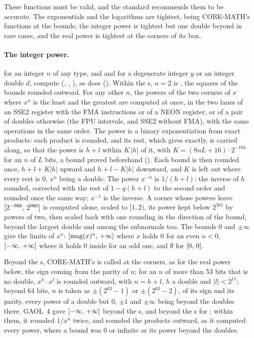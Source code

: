 These functions must be valid, and the standard recommends them to be
accurate. The exponentials and the logarithms are tightest, being
CORE-MATH's functions at the bounds; the integer power is tightest but one
double beyond in rare cases, and the real power is tightest at the corners
of its box.

\paragraph{The integer power.}%
 for an integer $n$ of any type, and  and
 for a degenerate integer $y$ or an integer double $d$,
compute  (, ,
), as does 
(). Within the s, $n=2$ is , the
squares of the bounds rounded outward.\newinvfive{} For any other $n$, the
powers of the two corners of $x$ where $x^n$ is the least and the greatest
are computed at once, in the two lanes of an SSE2 register with the FMA
instructions or of a NEON register, or of a pair of doubles otherwise (the
FPU intervals, and SSE2 without FMA), with the same operations in the same
order.\newinvfive{} The power is a binary exponentiation from exact
products: each product is rounded, and its rest, which  gives
exactly, is carried along, so that the power is $h+l$ within $K\,|h|$ of
it, with $K=(8nL+16)\cdot2^{-104}$ for an $n$ of $L$ bits, a bound proved
beforehand (). Each bound is then
rounded once, $h+l+K|h|$ upward and $h+l-K|h|$ downward, and $K$ is left
out where every rest is $0$, $x^n$ being a double. The power $x^{-n}$ is
$1/(h+l)$: the inverse of $h$ rounded, corrected with the rest of
$1-q(h+l)$ to the second order and rounded once the same way; $x^{-1}$ is
the inverse. A corner whose powers leave $[2^{-968},\,2^{960}]$ is
computed alone, scaled to $[1, 2)$, its power kept below $2^{501}$ by
powers of two, then scaled back with one rounding in the direction of the
bound, beyond the largest double and among the subnormals too. The bounds
$0$ and $\pm\infty$ give the limits of $x^n$:
$[\mathrm{mag}(x)^n,\,+\infty]$ where $x$ holds $0$ for an even $n<0$,
$[-\infty,\,+\infty]$ where it holds $0$ inside for an odd one, and
$\emptyset$ for $[0,\,0]$.

Beyond the s, CORE-MATH's  is called at the corners,
as for the real power below, the sign coming from the parity of $n$; for an
$n$ of more than 53 bits that is no double, $x^h\cdot x^l$ is rounded
outward, with $n=h+l$, $h$ a double and $|l|<2^{11}$; beyond 64 bits, $n$
is taken as $\pm(2^{63}-1)$ or $\pm(2^{63}-2)$, of its sign and its parity,
every power of a double but $0$, $\pm1$ and $\pm\infty$ being beyond the
doubles there. GAOL~4 gave $[-\infty,\,+\infty]$ beyond the
s, and beyond the s for ;
within them, it rounded $1/x^n$ twice, and rounded the products outward, as
it computed every power, where a bound was $0$ or infinite or its power
beyond the doubles.\newinvfive

